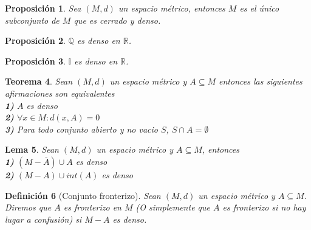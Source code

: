\documentclass[oneside]{book} %
\theoremstyle{Teorema}
\newtheorem{Definicion}{Definición}[chapter]
\newtheorem{Teorema}[Definicion]{Teorema}
\newtheorem{Proposicion}[Definicion]{Proposición}
\newtheorem{Lema}[Definicion]{Lema}
\theoremstyle{Ejemplos}
\theoremstyle{[Obs]}
\renewcommand{\{}{\left\lbrace} %
\renewcommand{\}}{\right\rbrace} %
\renewcommand{\u}{\cup} %
\newcommand{\n}{\cap} %
\renewcommand{\sc}{\subseteq} %
\newcommand{\R}{\mathbb{R}} %
\newcommand{\Q}{\mathbb{Q}} %
\newcommand{\I}{\mathbb{I}} %
\begin{document}
			\begin{Proposicion}

				Sea $(M, d)$ un espacio métrico, entonces $M$ es el único subconjunto de $M$ que es cerrado y denso. \\

			\end{Proposicion}

			\begin{Proposicion}
				
				$\Q$ es denso en $\R$. \\

			\end{Proposicion}

			\begin{Proposicion}
				
				$\I$ es denso en $\R$. \\

			\end{Proposicion}

			\begin{Teorema}
				
				Sean $(M, d)$ un espacio métrico y $A \sc M$ entonces las siguientes afirmaciones son equivalentes \\

				\textbf{1)} $A$ es denso \\

				\textbf{2)} $\forall x \in M : d(x, A) = 0$ \\

				\textbf{3)} Para todo conjunto abierto y no vacio $S$, $S \n A = \emptyset$

			\end{Teorema}

			\begin{Lema}
				
				Sean $(M, d)$ un espacio métrico y $A \sc M$, entonces \\

				\textbf{1)} $(M - \overline{A}) \u A$ es denso \\

				\textbf{2)} $(M - A) \u int(A)$ es denso \\

			\end{Lema}

			\begin{Definicion}[Conjunto fronterizo]
				
				Sean $(M, d)$ un espacio métrico y $A \sc M$. Diremos que $A$ es fronterizo en $M$ (O simplemente que $A$ es fronterizo si no hay lugar a confusión) si $M - A$ es denso. \\

			\end{Definicion}
\end{document}
